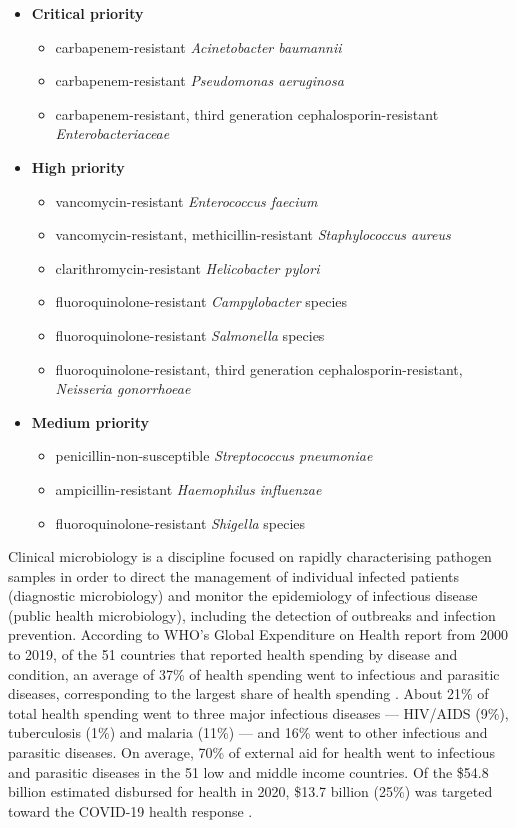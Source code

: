 \begin{itemize}
  \item{\textbf{Critical priority}}
  \begin{itemize}
    \item{carbapenem-resistant \textit{Acinetobacter baumannii}}
    \item{carbapenem-resistant \textit{Pseudomonas aeruginosa}}
    \item{carbapenem-resistant, third generation cephalosporin-resistant \textit{Enterobacteriaceae}} 
  \end{itemize}
  \item{\textbf{High priority}}
  \begin{itemize}
    \item{vancomycin-resistant \textit{Enterococcus faecium}}
    \item{vancomycin-resistant, methicillin-resistant \textit{Staphylococcus aureus}}
    \item{clarithromycin-resistant \textit{Helicobacter pylori}}
    \item{fluoroquinolone-resistant \textit{Campylobacter} species}
    \item{fluoroquinolone-resistant \textit{Salmonella} species}
    \item{fluoroquinolone-resistant, third generation cephalosporin-resistant, \textit{Neisseria gonorrhoeae}}
  \end{itemize}
  \item{\textbf{Medium priority}}
    \begin{itemize}
    \item{penicillin-non-susceptible \textit{Streptococcus pneumoniae}}
    \item{ampicillin-resistant \textit{Haemophilus influenzae}}
    \item{fluoroquinolone-resistant \textit{Shigella} species} 
  \end{itemize}
\end{itemize}


Clinical microbiology is a discipline focused on rapidly characterising pathogen samples in order to direct the management of individual infected patients (diagnostic microbiology) and monitor the epidemiology of infectious disease (public health microbiology), including the detection of outbreaks and infection prevention. According to WHO's Global Expenditure on Health report from 2000 to 2019, of the 51 countries that reported health spending by disease and condition, an average of 37\% of health spending went to infectious and parasitic diseases, corresponding to the largest share of health spending \citep{world_health_organization_global_2021}. About 21\% of total health spending went to three major infectious diseases — HIV/AIDS (9\%), tuberculosis (1\%) and malaria (11\%) — and 16\% went to other infectious and parasitic diseases. On average, 70\% of external aid for health went to infectious and parasitic diseases in the 51 low and middle income countries. Of the \$54.8 billion estimated disbursed for health in 2020, \$13.7 billion (25\%) was targeted toward the COVID-19 health response \citep{micah_tracking_2021}.

